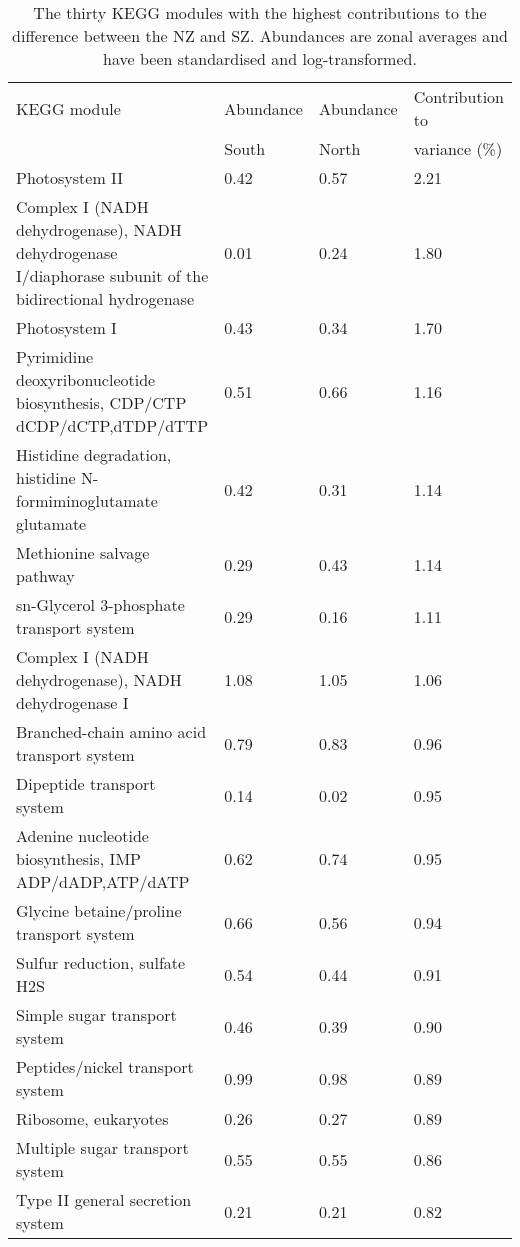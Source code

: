 \begin{sidewaystable}
\sffamily
\begin{center}
\caption[Contributions of KEGG modules to variance between the North and South zones]{\sffamily{}The thirty \ac{KEGG} modules with the highest contributions to the difference between the \ac{NZ} and \ac{SZ}.
Abundances are zonal averages and have been standardised and log-transformed.
}
\label{tab:modulessimper}
\smallskip
\begin{tabularx}{\textwidth}{Xlll}
\toprule
\ac{KEGG} module & Abundance & Abundance & Contribution to\\
& South & North & variance (\%)\\
\midrule
Photosystem II & 0.42 & 0.57 & 2.21\\
Complex I (NADH dehydrogenase), NADH dehydrogenase I/diaphorase subunit of the bidirectional hydrogenase & 0.01 & 0.24 & 1.80\\
Photosystem I & 0.43 & 0.34 & 1.70\\
Pyrimidine deoxyribonucleotide biosynthesis, CDP/CTP \textrightarrow{} dCDP/dCTP,dTDP/dTTP & 0.51 & 0.66 & 1.16\\
Histidine degradation, histidine \textrightarrow{} N-formiminoglutamate \textrightarrow{} glutamate & 0.42 & 0.31 & 1.14\\
Methionine salvage pathway & 0.29 & 0.43 & 1.14\\
sn-Glycerol 3-phosphate transport system & 0.29 & 0.16 & 1.11\\
Complex I (NADH dehydrogenase), NADH dehydrogenase I & 1.08 & 1.05 & 1.06\\
Branched-chain amino acid transport system & 0.79 & 0.83 & 0.96\\
Dipeptide transport system & 0.14 & 0.02 & 0.95\\
Adenine nucleotide biosynthesis, IMP \textrightarrow{} ADP/dADP,ATP/dATP & 0.62 & 0.74 & 0.95\\
Glycine betaine/proline transport system & 0.66 & 0.56 & 0.94\\
Sulfur reduction, sulfate \textrightarrow{} H2S & 0.54 & 0.44 & 0.91\\
Simple sugar transport system & 0.46 & 0.39 & 0.90\\
Peptides/nickel transport system & 0.99 & 0.98 & 0.89\\
Ribosome, eukaryotes & 0.26 & 0.27 & 0.89\\
Multiple sugar transport system & 0.55 & 0.55 & 0.86\\
Type II general secretion system & 0.21 & 0.21 & 0.82\\

\end{tabularx}
\end{center}
\end{sidewaystable}
